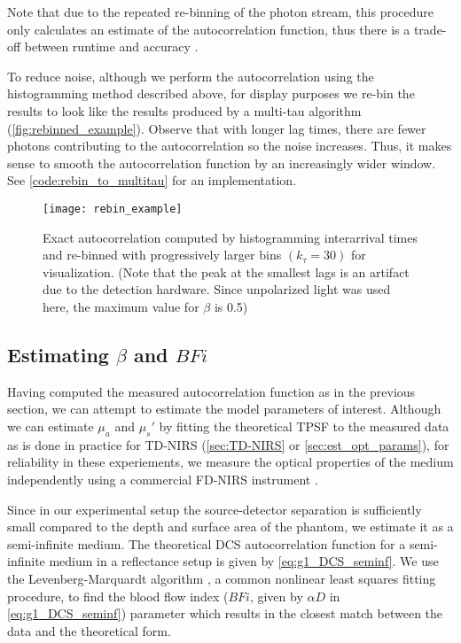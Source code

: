 Note that due to the repeated re-binning of the photon stream, this procedure only calculates an estimate of the autocorrelation function, thus there is a trade-off between runtime and accuracy \cite{Magatti2001}. 

To reduce noise, although we perform the autocorrelation using the histogramming method described above, for display purposes we re-bin the results to look like the results produced by a multi-tau algorithm (\autoref{fig:rebinned_example}). Observe that with longer lag times, there are fewer photons contributing to the autocorrelation so the noise increases. Thus, it makes sense to smooth the autocorrelation function by an increasingly wider window. See \autoref{code:rebin_to_multitau} for an implementation.

\begin{figure}[tb]
\texttt{[image: rebin\_example]}
\centering
\caption{Exact autocorrelation computed by histogramming interarrival times and re-binned with progressively larger bins $(k_\tau=30)$ for visualization. (Note that the peak at the smallest lags is an artifact due to the detection hardware. Since unpolarized light was used here, the maximum value for $\beta$ is 0.5)}
\label{fig:rebinned_example}
\end{figure}


\subsection{Estimating $\beta$ and $BFi$} \label{sec:fit_beta_bfi}
Having computed the measured autocorrelation function as in the previous section, we can attempt to estimate the model parameters of interest. Although we can estimate $\mu_a$ and $\mu_s'$ by fitting the theoretical TPSF to the measured data as is done in practice for TD-NIRS (\autoref{sec:TD-NIRS} or \autoref{sec:est_opt_params}), for reliability in these experiements, we measure the optical properties of the medium independently using a commercial FD-NIRS instrument \cite{MetaOx}.

Since in our experimental setup the source-detector separation is sufficiently small compared to the depth and surface area of the phantom, we estimate it as a semi-infinite medium. The theoretical DCS autocorrelation function for a semi-infinite medium in a reflectance setup is given by \autoref{eq:g1_DCS_seminf}. We use the Levenberg-Marquardt algorithm \cite{More1978}, a common nonlinear least squares fitting procedure, to find the blood flow index ($BFi$, given by $\alpha D$ in \autoref{eq:g1_DCS_seminf}) parameter which results in the closest match between the data and the theoretical form. 

